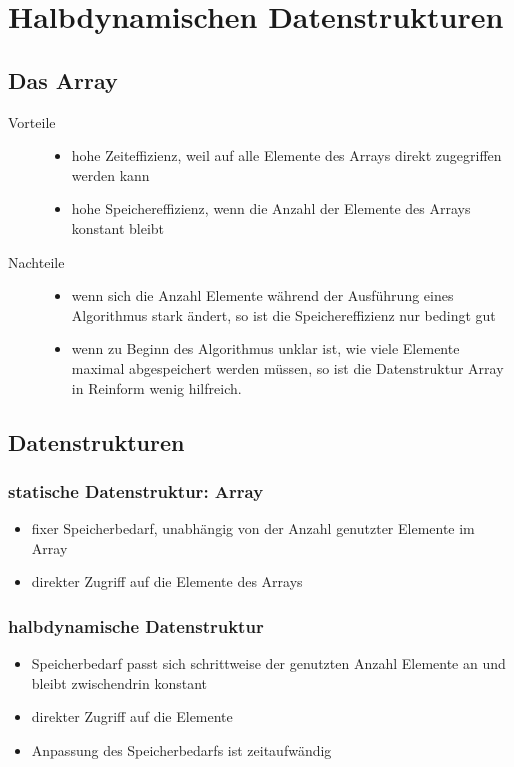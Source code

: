 \documentclass[a4paper,10pt]{article}
\begin{document}
\newpage
\section{Halbdynamischen Datenstrukturen}

\subsection{Das Array}

\begin{description}
	\item[Vorteile]  \hfill
		\begin{itemize}
			\item hohe Zeiteffizienz, weil auf alle Elemente des Arrays direkt zugegriffen werden kann
			\item hohe Speichereffizienz, wenn die Anzahl der Elemente des Arrays konstant bleibt
		\end{itemize}
	\item[Nachteile] \hfill
		\begin{itemize}
			\item wenn sich die Anzahl Elemente w\"ahrend der Ausf\"uhrung eines Algorithmus stark \"andert, so ist die Speichereffizienz nur bedingt gut
			\item wenn zu Beginn des Algorithmus unklar ist, wie viele Elemente maximal abgespeichert werden m\"ussen, so ist die Datenstruktur Array in Reinform wenig hilfreich.
		\end{itemize}
\end{description}

\subsection{Datenstrukturen}

\subsubsection{statische Datenstruktur: Array}
\begin{itemize}
	\item fixer Speicherbedarf, unabh\"angig von der Anzahl genutzter Elemente im Array
	\item direkter Zugriff auf die Elemente des Arrays
\end{itemize}

\subsubsection{halbdynamische Datenstruktur}
\begin{itemize}
	\item Speicherbedarf passt sich schrittweise der genutzten Anzahl Elemente an und bleibt zwischendrin konstant
	\item direkter Zugriff auf die Elemente
	\item Anpassung des Speicherbedarfs ist zeitaufw\"andig
\end{itemize}
\end{document}

